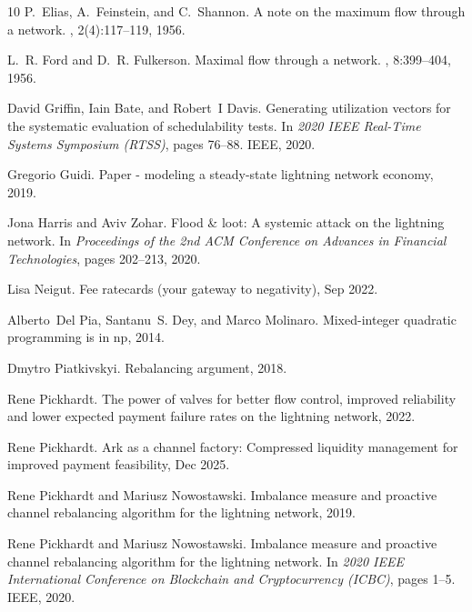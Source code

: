 \documentclass[10pt,twocolumn]{article}
\begin{document}
\begin{thebibliography}{10}
P.~Elias, A.~Feinstein, and C.~Shannon.
\newblock A note on the maximum flow through a network.
, 2(4):117--119, 1956.

L.~R. Ford and D.~R. Fulkerson.
\newblock Maximal flow through a network.
, 8:399–404, 1956.

David Griffin, Iain Bate, and Robert~I Davis.
\newblock Generating utilization vectors for the systematic evaluation of
  schedulability tests.
\newblock In {\em 2020 IEEE Real-Time Systems Symposium (RTSS)}, pages 76--88.
  IEEE, 2020.

Gregorio Guidi.
\newblock Paper - modeling a steady-state lightning network economy, 2019.

Jona Harris and Aviv Zohar.
\newblock Flood \& loot: A systemic attack on the lightning network.
\newblock In {\em Proceedings of the 2nd ACM Conference on Advances in
  Financial Technologies}, pages 202--213, 2020.

Lisa Neigut.
\newblock Fee ratecards (your gateway to negativity), Sep 2022.

Alberto~Del Pia, Santanu~S. Dey, and Marco Molinaro.
\newblock Mixed-integer quadratic programming is in np, 2014.

Dmytro Piatkivskyi.
\newblock Rebalancing argument, 2018.

Rene Pickhardt.
\newblock The power of valves for better flow control, improved reliability and
  lower expected payment failure rates on the lightning network, 2022.

Rene Pickhardt.
\newblock Ark as a channel factory: Compressed liquidity management for
  improved payment feasibility, Dec 2025.

Rene Pickhardt and Mariusz Nowostawski.
\newblock Imbalance measure and proactive channel rebalancing algorithm for the
  lightning network, 2019.

Rene Pickhardt and Mariusz Nowostawski.
\newblock Imbalance measure and proactive channel rebalancing algorithm for the
  lightning network.
\newblock In {\em 2020 IEEE International Conference on Blockchain and
  Cryptocurrency (ICBC)}, pages 1--5. IEEE, 2020.


\end{thebibliography}
\end{document}

